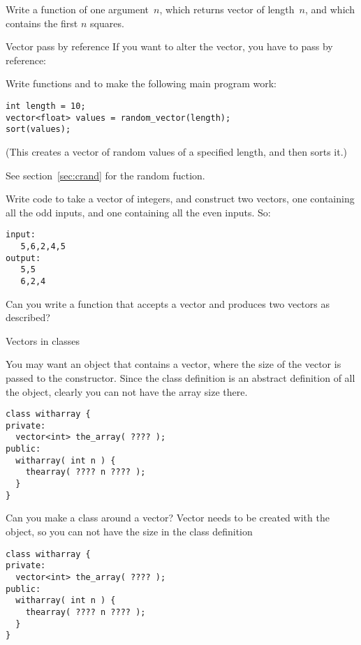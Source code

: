 \begin{exercise}
  \label{ex:vec-of-squares}
  Write a function of one  argument~$n$, which returns vector
  of length~$n$, and which contains the first $n$ squares.
\end{exercise}

\begin{block}{Vector pass by reference}
  \label{sl:vector-arg-ref}
  If you want to alter the vector, you have to pass by reference:
\end{block}

\begin{exercise}
  \label{ex:vec-rand-sort}
  Write functions  and  to make the following
  main program work:
\begin{lstlisting}
int length = 10;
vector<float> values = random_vector(length);
sort(values);
\end{lstlisting}
  (This creates a vector of random values of a specified length, and
then sorts it.)

See section~\ref{sec:crand} for the random fuction.
\end{exercise}

\begin{exercise}
  \label{ex:splitoddeven}
  Write code to take a vector of integers, and construct two
  vectors, one containing all the odd inputs, and one containing all
  the even inputs. So:
\begin{lstlisting}
input:
   5,6,2,4,5
output:
   5,5
   6,2,4
\end{lstlisting}
  Can you write a function that accepts a vector and produces two
  vectors as described?
\end{exercise}

 {Vectors in classes}

You may want an object that contains a vector, where the size of the
vector is passed to the constructor. Since the class definition is an
abstract definition of all the object, clearly you can not have the
array size there.

\begin{lstlisting}
class witharray {
private:
  vector<int> the_array( ???? );
public:
  witharray( int n ) {
    thearray( ???? n ???? );
  }
}
\end{lstlisting}

\begin{slide}{Can you make a class around a vector?}
  \label{sl:class-with-vector}
  Vector needs to be created with the object, so you can not have the
  size in the class definition
\begin{lstlisting}
class witharray {
private:
  vector<int> the_array( ???? );
public:
  witharray( int n ) {
    thearray( ???? n ???? );
  }
}
\end{lstlisting}
\end{slide}

